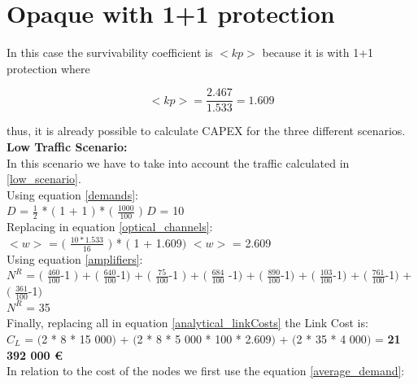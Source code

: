 
\section{Opaque with 1+1 protection}\label{analytical_Opaque_Protection}

In this case the survivability coefficient is $<kp>$ because it is with 1+1 protection where

\begin{equation*}
<kp> = \frac{2.467}{1.533} = 1.609
\end{equation*}

\noindent
thus, it is already possible to calculate CAPEX for the three different scenarios.\\

\textbf{Low Traffic Scenario:}\\

In this scenario we have to take into account the traffic calculated in \ref{low_scenario}.\\

Using equation \ref{demands}:\\

$D$ = $\frac{1}{2}$ * $($ 1 + 1 $)$ * $($ $\frac{1000}{100}$ $)$ \qquad \qquad $D$ = 10\\

Replacing in equation \ref{optical_channels}:\\

$<w>$ = $($ $\frac{10 * 1.533}{16}$ $)$ * $($ 1 + 1.609$)$ \qquad \qquad $<w>$ = 2.609\\

Using equation \ref{amplifiers}:\\

$N^R$ = $($ $\frac{460}{100}$-1 $)$ + $($ $\frac{640}{100}$-1$)$ + $($ $\frac{75}{100}$-1 $)$ + $($ $\frac{684}{100}$ -1$)$ + $($ $\frac{890}{100}$-1$)$ + $($ $\frac{103}{100}$-1$)$ + $($ $\frac{761}{100}$-1$)$ + $($ $\frac{361}{100}$-1$)$\\

$N^R$ = 35\\

Finally, replacing all in equation \ref{analytical_linkCosts} the Link Cost is:\\

$C_L$ = $($2 * 8 * 15 000$)$ + $($2 * 8 * 5 000 * 100 * 2.609$)$ + $($2 * 35 * 4 000$)$ = \textbf{21 392 000 \euro}\\

In relation to the cost of the nodes we first use the equation \ref{average_demand}:\\

